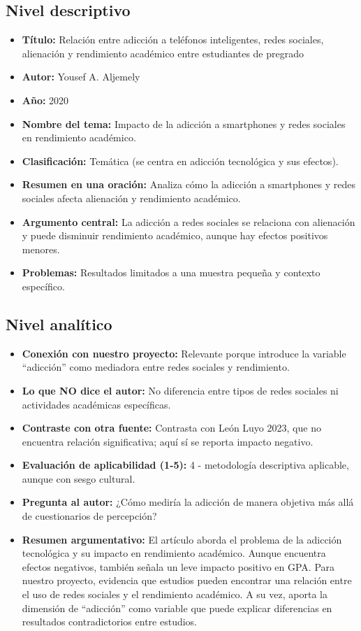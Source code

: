\documentclass[12pt]{article}
\begin{document}
\subsection*{Nivel descriptivo}
\begin{itemize}
  \item \textbf{Título:} Relación entre adicción a teléfonos inteligentes, redes sociales, alienación y rendimiento académico entre estudiantes de pregrado
  \item \textbf{Autor:} Yousef A. Aljemely
  \item \textbf{Año:} 2020
  \item \textbf{Nombre del tema:} Impacto de la adicción a smartphones y redes sociales en rendimiento académico.
  \item \textbf{Clasificación:} Temática (se centra en adicción tecnológica y sus efectos).
  \item \textbf{Resumen en una oración:} Analiza cómo la adicción a smartphones y redes sociales afecta alienación y rendimiento académico.
  \item \textbf{Argumento central:} La adicción a redes sociales se relaciona con alienación y puede disminuir rendimiento académico, aunque hay efectos positivos menores.
  \item \textbf{Problemas:} Resultados limitados a una muestra pequeña y contexto específico.
\end{itemize}

\subsection*{Nivel analítico}
\begin{itemize}
  \item \textbf{Conexión con nuestro proyecto:} Relevante porque introduce la variable “adicción” como mediadora entre redes sociales y rendimiento.
  \item \textbf{Lo que NO dice el autor:} No diferencia entre tipos de redes sociales ni actividades académicas específicas.
  \item \textbf{Contraste con otra fuente:} Contrasta con León Luyo 2023, que no encuentra relación significativa; aquí sí se reporta impacto negativo.
  \item \textbf{Evaluación de aplicabilidad (1-5):} 4 - metodología descriptiva aplicable, aunque con sesgo cultural.
  \item \textbf{Pregunta al autor:} ¿Cómo mediría la adicción de manera objetiva más allá de cuestionarios de percepción?
  \item \textbf{Resumen argumentativo:} El artículo aborda el problema de la adicción tecnológica y su impacto en rendimiento académico. Aunque encuentra efectos negativos, también señala un leve impacto positivo en GPA. Para nuestro proyecto, evidencia que estudios pueden encontrar una relación entre el uso de redes sociales y el rendimiento académico. A su vez, aporta la dimensión de “adicción” como variable que puede explicar diferencias en resultados contradictorios entre estudios.
\end{itemize}
\end{document}
